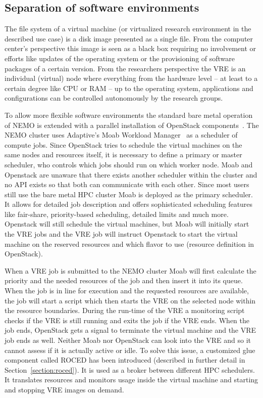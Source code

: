 \subsection{Separation of software environments}

The file system of a virtual machine (or virtualized research environment in the described use case) is a
disk image presented as a single file. From the computer center's perspective
this image is seen as a black box requiring no involvement or efforts like
updates of the operating system or the provisioning of software packages of a
certain version. From the researchers perspective the VRE is an individual
(virtual) node where everything from the hardware level -- at least to a
certain degree like CPU or RAM -- up to the operating system,
applications and configurations can be controlled autonomously by the research groups.

To allow more flexible software environments the standard bare metal
operation of NEMO is extended with a parallel installation of OpenStack
components~\cite{hpc-symp:2016}.
The NEMO cluster uses Adaptive's Moab Workload Manager~\cite{Moab} as a
scheduler of compute jobs.
Since OpenStack tries to schedule the virtual machines on the same nodes and
resources itself, it is necessary to define a primary or master scheduler, who
controls which jobs should run on which worker node. Moab and Openstack are
unaware that there exists another scheduler within the cluster and no API exists
so that both can communicate with each other. Since most users still use the
bare metal HPC cluster Moab is deployed as the primary scheduler. It allows for
detailed job description and offers sophisticated scheduling features like
fair-share, priority-based scheduling, detailed limits and much more. Openstack
will still schedule the virtual machines, but Moab will initially start the VRE
jobs and the VRE job will instruct Openstack to start the virtual machine on the
reserved resources and which flavor to use (resource definition in OpenStack).

When a VRE job is submitted to the NEMO cluster Moab will first calculate the
priority and the needed resources of the job and then insert it into its queue.
When the job is in line for execution and the requested resources are available,
the job will start a script which then starts the VRE on the selected node
within the resource boundaries. During the run-time of the VRE a monitoring
script checks if the VRE is still running and exits the job if the VRE ends.
When the job ends, OpenStack gets a signal to terminate the virtual machine and
the VRE job ends as well.  Neither Moab nor OpenStack can look into the VRE and
so it cannot assess if it is actually active or idle. To solve this issue, a
customized glue component called ROCED has been introduced (described in
further detail in Section~\ref{section:roced}).  It is used as a broker between
different HPC schedulers. It translates resources and monitors usage inside the
virtual machine and starting and stopping VRE images on demand.
